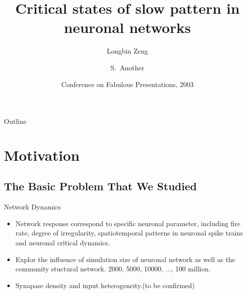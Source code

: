\documentclass{beamer}
\title[Short Paper Title] %
{Critical states of slow pattern in neuronal networks}
\author[Author, Another] %
{Longbin Zeng\inst{1} \and S.~Another\inst{2}}
\institute[Universities of Somewhere and Elsewhere] %
{
  \inst{1}%
  Department of Computer Science\\
  University of Somewhere
  \and
  \inst{2}%
  Department of Theoretical Philosophy\\
  University of Elsewhere}
\date[CFP 2003] %
{Conference on Fabulous Presentations, 2003}
\begin{document}
\begin{frame}
  \titlepage
\end{frame}

\begin{frame}{Outline}
  \tableofcontents
\end{frame}





\section{Motivation}

\subsection{The Basic Problem That We Studied}

\begin{frame}{Network Dynamics}  %

  \begin{itemize}
  \item
    Network response correspond to specific neuronal parameter, including fire rate, degree of irregularity, spatiotemporal patterns in neuronal spike trains and neuronal critical dynamics.
  \item
	Explor the influence of simulation size of neuronal network as well as the community stuctural network. 2000, 5000, 10000, ..., 100 million. 
  \item 
  Synapase density and input heterogeneity.(to be confirmed)
  \end{itemize}
\end{frame}
\end{document}
